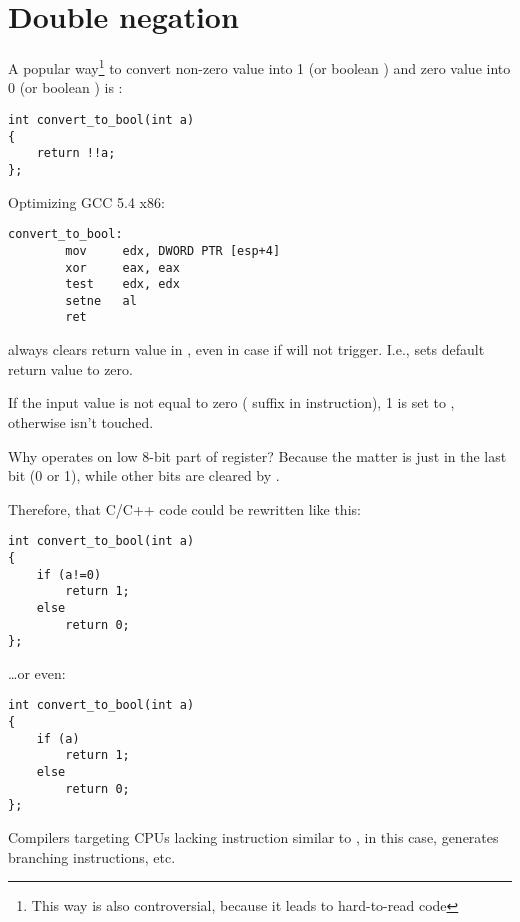 \section{Double negation}

A popular way\footnote{This way is also controversial, because it leads to hard-to-read code} to convert non-zero value into 1 (or boolean ) and zero value into 0 (or boolean ) is :

\begin{lstlisting}[style=customc]
int convert_to_bool(int a)
{
	return !!a;
};
\end{lstlisting}

Optimizing GCC 5.4 x86:

\begin{lstlisting}[style=customasmx86]
convert_to_bool:
        mov     edx, DWORD PTR [esp+4]
        xor     eax, eax
        test    edx, edx
        setne   al
        ret
\end{lstlisting}

 always clears return value in \EAX, even in case if  will not trigger.
I.e.,  sets default return value to zero.

If the input value is not equal to zero ( suffix in  instruction),
1 is set to \AL, otherwise \AL isn't touched.

Why  operates on low 8-bit part of \EAX register?
Because the matter is just in the last bit (0 or 1), while other bits are cleared by .

Therefore, that C/C++ code could be rewritten like this:

\begin{lstlisting}[style=customc]
int convert_to_bool(int a)
{
	if (a!=0)
		return 1;
	else
		return 0;
};
\end{lstlisting}

\dots or even:

\begin{lstlisting}[style=customc]
int convert_to_bool(int a)
{
	if (a)
		return 1;
	else
		return 0;
};
\end{lstlisting}

Compilers targeting \ac{CPU}s lacking instruction similar to , in this case,
generates branching instructions, etc.

